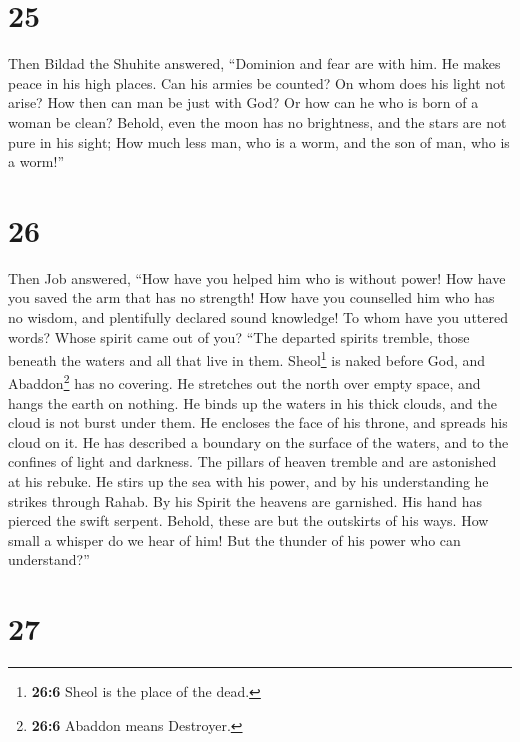 \hypertarget{section-24}{%
\section{25}\label{section-24}}

 Then Bildad the Shuhite answered, 
``Dominion and fear are with him. He makes peace in his high places.
 Can his armies be counted? On whom does his light not
arise?  How then can man be just with God? Or how can he
who is born of a woman be clean?  Behold, even the moon
has no brightness, and the stars are not pure in his sight;
 How much less man, who is a worm, and the son of man, who
is a worm!''

\hypertarget{section-25}{%
\section{26}\label{section-25}}

 Then Job answered,  ``How have you helped
him who is without power! How have you saved the arm that has no
strength!  How have you counselled him who has no wisdom,
and plentifully declared sound knowledge!  To whom have
you uttered words? Whose spirit came out of you?  ``The
departed spirits tremble, those beneath the waters and all that live in
them.  Sheol\footnote{\textbf{26:6} Sheol is the place of
  the dead.} is naked before God, and Abaddon\footnote{\textbf{26:6}
  Abaddon means Destroyer.} has no covering.  He stretches
out the north over empty space, and hangs the earth on nothing.
 He binds up the waters in his thick clouds, and the cloud
is not burst under them.  He encloses the face of his
throne, and spreads his cloud on it.  He has described a
boundary on the surface of the waters, and to the confines of light and
darkness.  The pillars of heaven tremble and are
astonished at his rebuke.  He stirs up the sea with his
power, and by his understanding he strikes through Rahab.
 By his Spirit the heavens are garnished. His hand has
pierced the swift serpent.  Behold, these are but the
outskirts of his ways. How small a whisper do we hear of him! But the
thunder of his power who can understand?''

\hypertarget{section-26}{%
\section{27}\label{section-26}}

